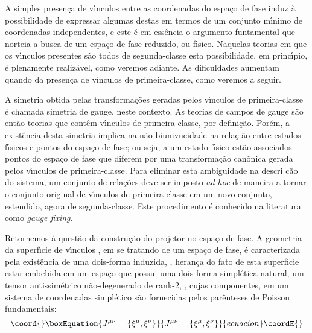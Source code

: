 \documentclass[a4paper,thmsa,12pt]{report}
\begin{document}
A simples presen\c{c}a de v\'{\i}nculos entre as coordenadas do espa\c{c}o
de fase induz \`{a} possibilidade de expressar algumas destas em termos de
um conjunto m\'{\i}nimo de coordenadas independentes, e este \'{e} em
ess\^{e}ncia o argumento funtamental que norteia a busca de um espa\c{c}o de
fase reduzido, ou f\'{\i}sico. Naquelas teorias em que os v\'{\i}nculos
presentes s\~{a}o todos de segunda-classe esta possibilidade, em
princ\'{\i}pio, \'{e} plenamente realiz\'{a}vel, como veremos adiante. As
dificuldades aumentam quando da presen\c{c}a de v\'{\i}nculos de
primeira-classe, como veremos a seguir.

A simetria obtida pelas transforma\c{c}\~{o}es geradas pelos v\'{\i}nculos
de primeira-classe \'{e} chamada simetria de gauge, neste contexto. As
teorias de campos de gauge s\~{a}o ent\~{a}o teorias que cont\^{e}m
v\'{\i}nculos de primeira-classe, por defini\c{c}\~{a}o. Por\'{e}m, a
exist\^{e}ncia desta simetria implica na n\~{a}o-biunivucidade na rela\c{c}%
\~{a}o entre estados f\'{\i}sicos e pontos do espa\c{c}o de fase; ou seja, a
um estado f\'{\i}sico est\~{a}o associados pontos do espa\c{c}o de fase que
diferem por uma transforma\c{c}\~{a}o can\^{o}nica gerada pelos
v\'{\i}nculos de primeira-classe. Para eliminar esta ambiguidade na descri\c{%
c}\~{a}o do sistema, um conjunto de rela\c{c}\~{o}es deve ser imposto 
\textit{ad hoc }de maneira a tornar o conjunto original de v\'{\i}nculos de
primeira-classe em um novo conjunto, estendido, agora de segunda-classe.
Este procedimento \'{e} conhecido na literatura como \textit{gauge fixing.}

Retornemos \`{a} quest\~{a}o da constru\c{c}\~{a}o do projetor no espa\c{c}o
de fase. A geometria da superf\'{\i}cie de v\'{\i}nculos \cite{teitelboim},
em se tratando de um espa\c{c}o de fase, \'{e} caracterizada pela
exist\^{e}ncia de uma dois-forma induzida, \coordHE{}, heran\c{c}a do fato de
esta superf\'{\i}cie estar embebida em um espa\c{c}o que possui uma
dois-forma simpl\'{e}tica natural, um tensor antissim\'{e}trico
n\~{a}o-degenerado de rank-2, \coordHE{}, cujas componentes, em um
sistema de coordenadas simpl\'{e}tico \myHighlight{$\xi ^{\lambda }$}\coordHE{} s\~{a}o fornecidas
pelos par\^{e}nteses de Poisson fundamentais: 
\begin{equation}\coord{}\boxEquation{
J^{\mu \nu }=\{\xi ^{\mu },\xi ^{\nu }\}  \label{11}
}{
J^{\mu \nu }=\{\xi ^{\mu },\xi ^{\nu }\}  }{ecuacion}\coordE{}\end{equation}
\end{document}
